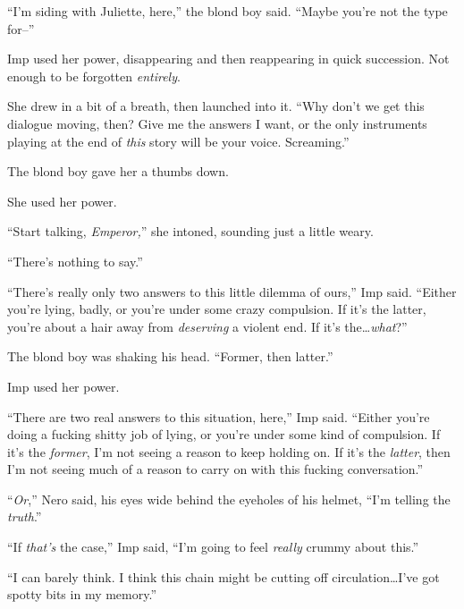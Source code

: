 ``I'm siding with Juliette, here,'' the blond boy said.  ``Maybe you're not the type for--''



Imp used her power, disappearing and then reappearing in quick succession.  Not enough to be forgotten \emph{entirely}.



She drew in a bit of a breath, then launched into it.  ``Why don't we get this dialogue moving, then?  Give me the answers I want, or the only instruments playing at the end of \emph{this} story will be your voice.  Screaming.''



The blond boy gave her a thumbs down.



She used her power.



``Start talking, \emph{Emperor,}'' she intoned, sounding just a little weary.



``There's nothing to say.''



``There's really only two answers to this little dilemma of ours,'' Imp said.  ``Either you're lying, badly, or you're under some crazy compulsion.  If it's the latter, you're about a hair away from \emph{deserving} a violent end.  If it's the\ldots \emph{what}?''



The blond boy was shaking his head.  ``Former, then latter.''



Imp used her power.



``There are two real answers to this situation, here,'' Imp said.  ``Either you're doing a fucking shitty job of lying, or you're under some kind of compulsion.  If it's the \emph{former}, I'm not seeing a reason to keep holding on.  If it's the \emph{latter}, then I'm not seeing much of a reason to carry on with this fucking conversation.''



``\emph{Or},'' Nero said, his eyes wide behind the eyeholes of his helmet, ``I'm telling the \emph{truth}.''



``If \emph{that's} the case,'' Imp said, ``I'm going to feel \emph{really} crummy about this.''



``I can barely think.  I think this chain might be cutting off circulation\ldots I've got spotty bits in my memory.''



